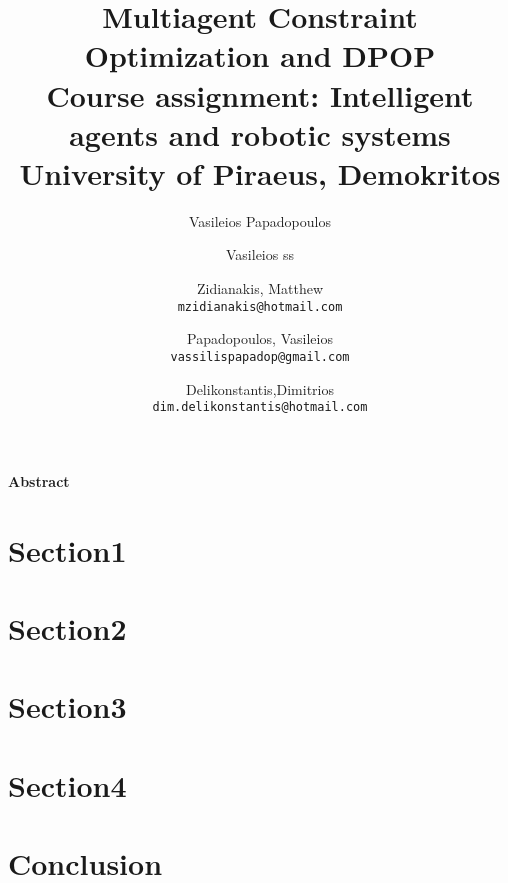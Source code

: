 \documentclass[10pt,a4paper,twocolumn]{article}
\title{%
	Multiagent Constraint Optimization and DPOP\\
	\large Course assignment: Intelligent agents and robotic systems \\
	University of Piraeus, Demokritos}
\author{Vasileios Papadopoulos}
\author{Vasileios ss}
\author{
	Zidianakis, Matthew\\
	\texttt{mzidianakis@hotmail.com}
	\and
	Papadopoulos, Vasileios\\
	\texttt{vassilispapadop@gmail.com}
	\and
	Delikonstantis,Dimitrios\\
	\texttt{dim.delikonstantis@hotmail.com}
}
\begin{document}
	\maketitle
	
	\textbf{Abstract}

	
	\section{Section1}
	

	
	\section{Section2}
	


	
	\section{Section3}




	
	\section{Section4}

	\section{Conclusion}

	
	\begin{thebibliography}{9}

	\end{thebibliography}
	
	
\end{document}
